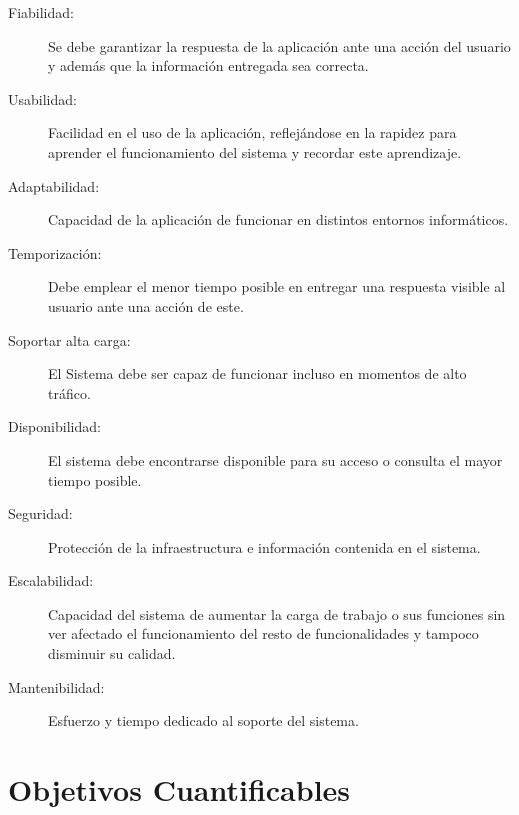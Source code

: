 \begin{description}

\item[Fiabilidad:]\hfill

Se debe garantizar la respuesta de la aplicación ante una acción del usuario y además que la información entregada sea correcta.

\item[Usabilidad:]\hfill

Facilidad en el uso de la aplicación, reflejándose en la rapidez para aprender el funcionamiento del sistema y recordar este aprendizaje.

\item[Adaptabilidad:]\hfill

Capacidad de la aplicación de funcionar en distintos entornos informáticos.

\item[Temporización:]\hfill 

Debe emplear el menor tiempo posible en entregar una respuesta visible al usuario ante una acción de este.

\item[Soportar alta carga:]\hfill 

El Sistema debe ser capaz de funcionar incluso en momentos de alto tráfico. 

\item[Disponibilidad:]\hfill 

El sistema debe encontrarse disponible para su acceso o consulta el mayor tiempo posible.

\item[Seguridad:]\hfill 

Protección de la infraestructura e información contenida en el sistema.

\item[Escalabilidad:]\hfill 

Capacidad del sistema de aumentar la carga de trabajo o sus funciones sin ver afectado el funcionamiento del resto de funcionalidades y tampoco disminuir su calidad.

\item[Mantenibilidad:]\hfill

 Esfuerzo y tiempo dedicado al soporte del sistema.

\end{description}

\section{Objetivos Cuantificables}

